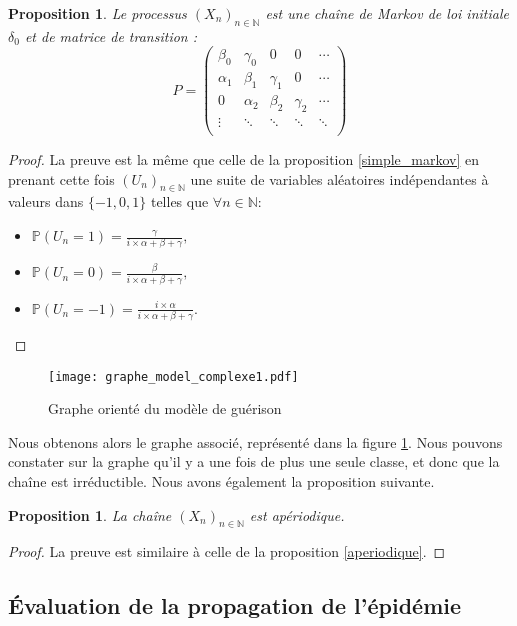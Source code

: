 \documentclass[12pt,a4paper]{report}
\newtheorem{prop}[thm]{Proposition}
\theoremstyle{remark}
\begin{document}
\begin{prop}
Le processus $(X_n)_{n \in \mathbb{N}}$ est une chaîne de Markov de loi initiale $\delta_0$ et de matrice de transition :
$$P=
\begin{pmatrix}
        \beta_0 & \gamma_0 & 0 & 0 & \cdots \\
         \alpha_1 & \beta_1 & \gamma_1 & 0 & \cdots\\
         0 & \alpha_2 & \beta_2 & \gamma_2 & \cdots\\
        \vdots &\ddots & \ddots & \ddots & \ddots \\
\end{pmatrix}$$
\end{prop}
\begin{proof}
La preuve est la même que celle de la proposition \ref{simple_markov} en prenant cette fois $(U_n)_{n\in \mathbb{N}}$ une suite de variables aléatoires indépendantes à valeurs dans $\{-1, 0, 1\}$ telles que $\forall n \in \mathbb{N}$: \\
\begin{itemize}
    \item $\mathbb{P}(U_n=1)= \frac{\gamma}{i \times \alpha+\beta+\gamma},$
    \item $\mathbb{P}(U_n=0)= \frac{\beta}{i \times \alpha+\beta+\gamma},$
    \item $\mathbb{P}(U_n=-1)= \frac{i \times \alpha}{i \times \alpha+\beta+\gamma}.$
\end{itemize}
\end{proof}

\begin{figure}[h!]
    \centering
    \texttt{[image: graphe\_model\_complexe1.pdf]}
   \caption{Graphe orienté du modèle de guérison}
    \label{fig:graph}
\end{figure}

Nous obtenons alors le graphe associé, représenté dans la figure \ref{fig:graph}. Nous pouvons constater sur la graphe qu'il y a une fois de plus une seule classe, et donc que la chaîne est irréductible. Nous avons également la proposition suivante.
\begin{prop}\label{aperiodique_guerison}
La chaîne $(X_n)_{n \in \mathbb{N}}$ est apériodique.
\end{prop}
\begin{proof}
La preuve est similaire à celle de la proposition \ref{aperiodique}.
\end{proof}

\subsection{Évaluation de la propagation de l'épidémie}
\vspace{0.6cm}
\end{document}
